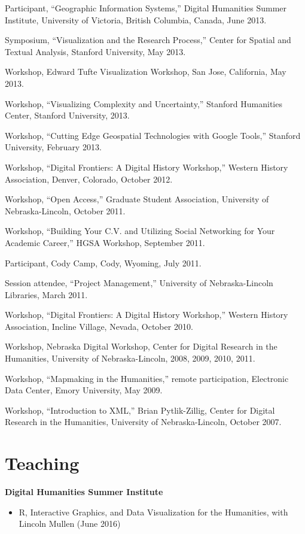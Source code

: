 Participant, ``Geographic Information Systems,'' Digital Humanities
Summer Institute, University of Victoria, British Columbia, Canada, June
2013.

Symposium, ``Visualization and the Research Process,'' Center for
Spatial and Textual Analysis, Stanford University, May 2013.

Workshop, Edward Tufte Visualization Workshop, San Jose, California, May
2013.

Workshop, ``Visualizing Complexity and Uncertainty,'' Stanford
Humanities Center, Stanford University, 2013.

Workshop, ``Cutting Edge Geospatial Technologies with Google Tools,''
Stanford University, February 2013.

Workshop, ``Digital Frontiers: A Digital History Workshop,'' Western
History Association, Denver, Colorado, October 2012.

Workshop, ``Open Access,'' Graduate Student Association, University of
Nebraska-Lincoln, October 2011.

Workshop, ``Building Your C.V. and Utilizing Social Networking for Your
Academic Career,'' HGSA Workshop, September 2011.

Participant, Cody Camp, Cody, Wyoming, July 2011.

Session attendee, ``Project Management,'' University of Nebraska-Lincoln
Libraries, March 2011.

Workshop, ``Digital Frontiers: A Digital History Workshop,'' Western
History Association, Incline Village, Nevada, October 2010.

Workshop, Nebraska Digital Workshop, Center for Digital Research in the
Humanities, University of Nebraska-Lincoln, 2008, 2009, 2010, 2011.

Workshop, ``Mapmaking in the Humanities,'' remote participation,
Electronic Data Center, Emory University, May 2009.

Workshop, ``Introduction to XML,'' Brian Pytlik-Zillig, Center for
Digital Research in the Humanities, University of Nebraska-Lincoln,
October 2007.

\section{Teaching}\label{teaching}

\textbf{Digital Humanities Summer Institute}

\begin{itemize}
\tightlist
\item
  R, Interactive Graphics, and Data Visualization for the Humanities,
  with Lincoln Mullen (June 2016)
\end{itemize}

